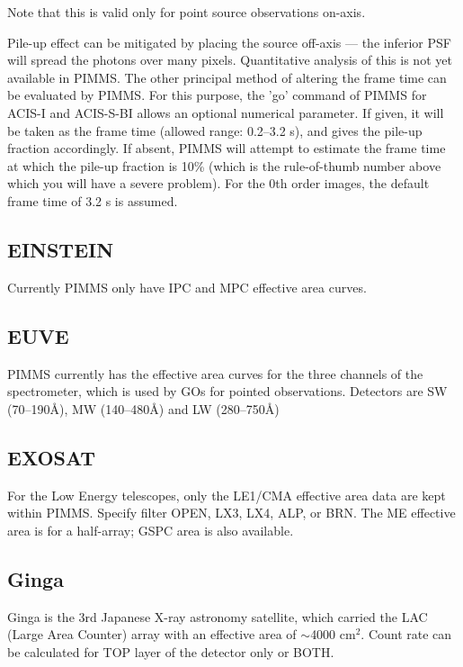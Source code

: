 Note that this is valid only for point source observations on-axis.

Pile-up effect can be mitigated by placing the source off-axis --- the
inferior PSF will spread the photons over many pixels.  Quantitative
analysis of this is not yet available in PIMMS.   The other principal
method of altering the frame time can be evaluated by PIMMS.  For this
purpose, the 'go' command of PIMMS for ACIS-I and ACIS-S-BI allows an
optional numerical parameter.  If given, it will be taken as the frame
time (allowed range: 0.2--3.2 s), and gives the pile-up fraction
accordingly.  If absent, PIMMS will attempt to estimate the frame time
at which the pile-up fraction is 10\% (which is the rule-of-thumb number
above which you will have a severe problem).  For the 0th order
images, the default frame time of 3.2 s is assumed.

\subsection{EINSTEIN}

Currently PIMMS only have IPC and MPC effective area curves.

\subsection{EUVE}

PIMMS currently has the effective area curves for the three channels of  the
spectrometer, which is used by GOs for pointed observations.  Detectors
are SW (70--190\AA), MW (140--480\AA) and LW (280--750\AA)

\subsection{EXOSAT}

For the Low Energy telescopes, only the LE1/CMA effective area data
are kept within PIMMS. Specify filter OPEN, LX3, LX4, ALP, or BRN.
The ME effective area is for a half-array; GSPC area is also available.

\subsection{Ginga}

Ginga is the 3rd Japanese X-ray astronomy satellite, which carried the LAC
(Large Area Counter) array with an effective area of $\sim$4000 cm$^2$.
Count rate can be calculated for TOP layer of the detector only or BOTH.

